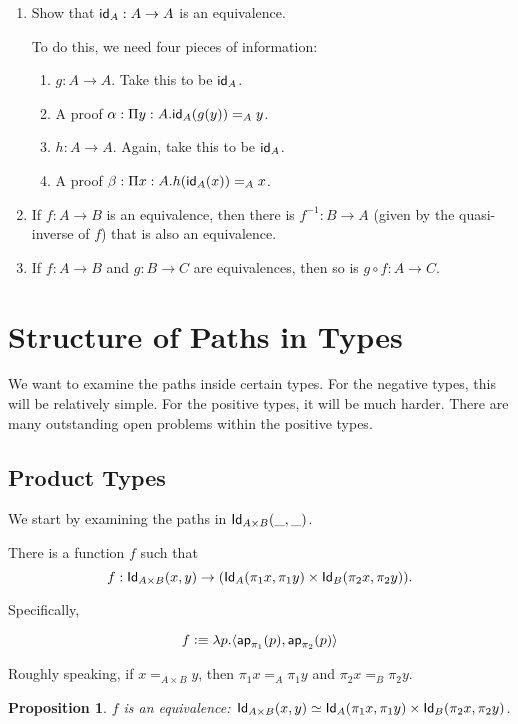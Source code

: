 \documentclass[12pt]{article}
\newcommand{\ap}{\mathsf{ap}}
\newcommand*{\comp}{\mathbin{\circ}}
\newtheorem*{proposition}{Proposition}
\begin{document}
\begin{enumerate}
 \item Show that $\textsf{id}_A: A\to A$ is an equivalence.
 
 To do this, we need four pieces of information:
 \begin{enumerate}
  \item $g: A\to A$. Take this to be $\textsf{id}_A$.
  \item A proof $\alpha: \Pi y:A. \textsf{id}_A(g (y)) =_A y$.
  \item $h: A\to A$. Again, take this to be $\textsf{id}_A$.
  \item A proof $\beta: \Pi x:A. h(\textsf{id}_A(x)) =_A x$.
 \end{enumerate}

 \item If $f: A\to B$ is an equivalence, then there is $f^{-1}: B\to A$ (given by 
 the quasi-inverse of $f$) that is also an equivalence.
 
 \item If $f: A\to B$ and $g: B\to C$ are equivalences, then so is $g\comp f: A\to C$.
\end{enumerate}



\section{Structure of Paths in Types}

We want to examine the paths inside certain types. For the negative types, this will be
relatively simple. For the positive types, it will be much harder. There are many outstanding
open problems within the positive types.

\subsection{Product Types}
We start by examining the paths in $\mathsf{Id}_{A\times B}(\_,\_)$. 

There is a function $f$ such that
$$f: \mathsf{Id}_{A\times B}(x,y) \to (\mathsf{Id}_{A}(\pi_1 x, \pi_1 y) \times \mathsf{Id}_{B}(\pi_2 x,\pi_2 y)).$$

Specifically,

$$f\defeq \lambda p.\langle \ap_{\pi_1} (p) , \ap_{\pi_2} (p) \rangle$$

Roughly speaking, if $x =_{A\times B} y$, then $\pi_1 x =_A \pi_1 y$ and $\pi_2 x =_B \pi_2 y$.

\begin{proposition} $f$ is an equivalence:
 $\mathsf{Id}_{A\times B}(x,y) \simeq \mathsf{Id}_{A}(\pi_1 x, \pi_1 y) \times \mathsf{Id}_{B}(\pi_2 x, \pi_2 y)$.
\end{proposition}
\end{document}
